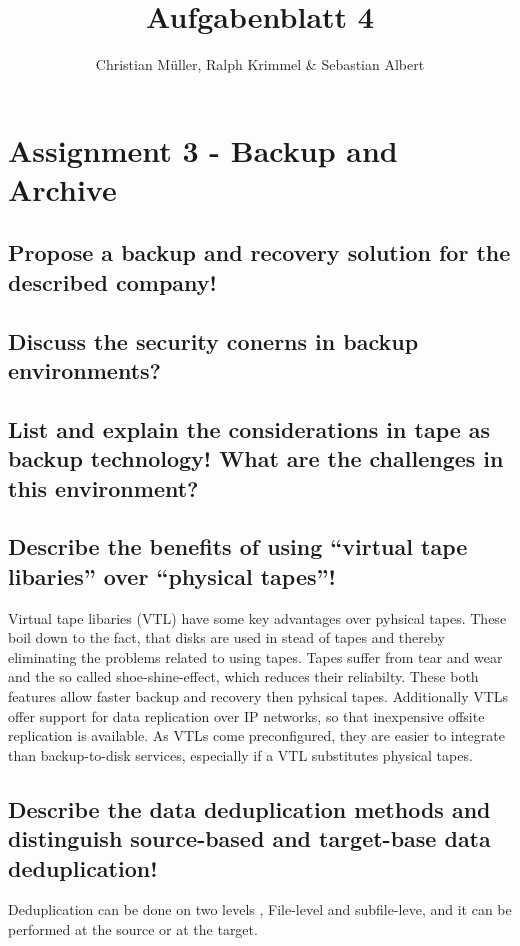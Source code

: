 \documentclass{article}
\title{Aufgabenblatt 4}
\author{Christian Müller, Ralph Krimmel \& Sebastian Albert }
\begin{document}
\maketitle

\section*{Assignment 3 - Backup and Archive}

\subsection{Propose a backup and recovery solution for the described company!}

\subsection{Discuss the security conerns in backup environments?}

\subsection{List and explain the considerations in tape as backup technology!
				What are the challenges in this environment?}

\subsection{Describe the benefits of using ``virtual tape libaries'' over ``physical tapes''!}
	Virtual tape libaries (VTL) have some key advantages over pyhsical tapes.
	These boil down to the fact,
	that disks are used in stead of tapes
	and thereby eliminating the problems related to using tapes.
	Tapes suffer from tear and wear and the so called shoe-shine-effect,
	which reduces their reliabilty.
	These both features allow faster backup and recovery
	then pyhsical tapes.
	Additionally VTLs offer support for data replication over IP networks,
	so that inexpensive offsite replication is available.
	As VTLs come preconfigured,
	they are easier to integrate than backup-to-disk services,
	especially if a VTL substitutes physical tapes.

\subsection{Describe the data deduplication methods and distinguish source-based and target-base data deduplication!}
	Deduplication can be done on two levels , File-level and subfile-leve,
	and it can be performed at the source or at the target.
\end{document}
